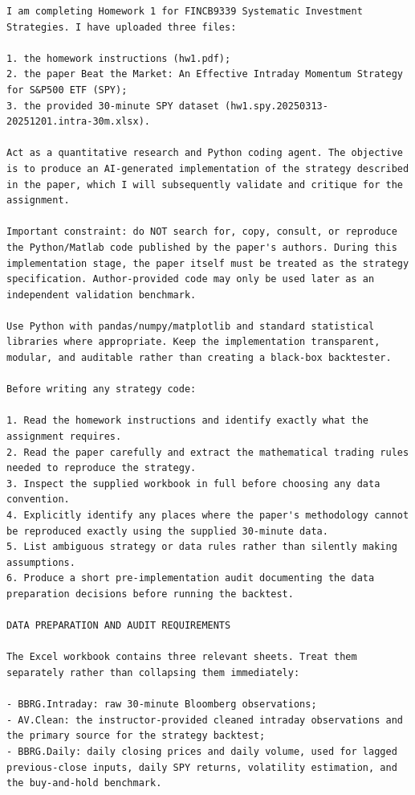 \documentclass{article}
\begin{document}
\begin{lstlisting}
I am completing Homework 1 for FINCB9339 Systematic Investment Strategies. I have uploaded three files:

1. the homework instructions (hw1.pdf);
2. the paper Beat the Market: An Effective Intraday Momentum Strategy for S&P500 ETF (SPY);
3. the provided 30-minute SPY dataset (hw1.spy.20250313-20251201.intra-30m.xlsx).

Act as a quantitative research and Python coding agent. The objective is to produce an AI-generated implementation of the strategy described in the paper, which I will subsequently validate and critique for the assignment.

Important constraint: do NOT search for, copy, consult, or reproduce the Python/Matlab code published by the paper's authors. During this implementation stage, the paper itself must be treated as the strategy specification. Author-provided code may only be used later as an independent validation benchmark.

Use Python with pandas/numpy/matplotlib and standard statistical libraries where appropriate. Keep the implementation transparent, modular, and auditable rather than creating a black-box backtester.

Before writing any strategy code:

1. Read the homework instructions and identify exactly what the assignment requires.
2. Read the paper carefully and extract the mathematical trading rules needed to reproduce the strategy.
3. Inspect the supplied workbook in full before choosing any data convention.
4. Explicitly identify any places where the paper's methodology cannot be reproduced exactly using the supplied 30-minute data.
5. List ambiguous strategy or data rules rather than silently making assumptions.
6. Produce a short pre-implementation audit documenting the data preparation decisions before running the backtest.

DATA PREPARATION AND AUDIT REQUIREMENTS

The Excel workbook contains three relevant sheets. Treat them separately rather than collapsing them immediately:

- BBRG.Intraday: raw 30-minute Bloomberg observations;
- AV.Clean: the instructor-provided cleaned intraday observations and the primary source for the strategy backtest;
- BBRG.Daily: daily closing prices and daily volume, used for lagged previous-close inputs, daily SPY returns, volatility estimation, and the buy-and-hold benchmark.


\end{lstlisting}
\end{document}
